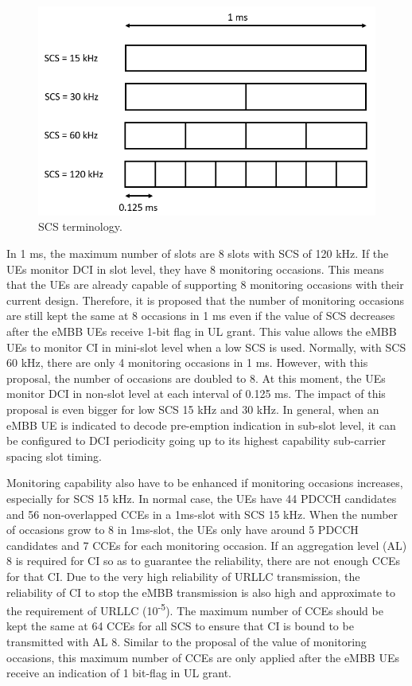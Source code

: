 \documentclass{ieeeaccess}
\begin{document}
\begin{figure}[htbp]
\centerline{\includegraphics[scale=0.3]{fig9.PNG}}
\caption{SCS terminology.}
\label{fig9}
\vspace{-2mm}
\end{figure}

In 1 ms, the maximum number of slots are 8 slots with SCS of 120 kHz. If the UEs monitor DCI in slot level, they have 8 monitoring occasions. This means that the UEs are already capable of supporting 8 monitoring occasions with their current design. Therefore, it is proposed that the number of monitoring occasions are still kept the same at 8 occasions in 1 ms even if the value of SCS decreases after the eMBB UEs receive 1-bit flag in UL grant. This value allows the eMBB UEs to monitor CI in mini-slot level when a low SCS is used. Normally, with SCS 60 kHz, there are only 4 monitoring occasions in 1 ms. However, with this proposal, the number of occasions are doubled to 8. At this moment, the UEs monitor DCI in non-slot level at each interval of 0.125 ms. The impact of this proposal is even bigger for low SCS 15 kHz and 30 kHz. In general, when an eMBB UE is indicated to decode pre-emption indication in sub-slot level, it can be configured to DCI periodicity going up to its highest capability sub-carrier spacing slot timing. 

Monitoring capability also have to be enhanced if monitoring occasions increases, especially for SCS 15 kHz. In normal case, the UEs have 44 PDCCH candidates and 56 non-overlapped CCEs in a 1ms-slot with SCS 15 kHz. When the number of occasions grow to 8 in 1ms-slot, the UEs only have around 5 PDCCH candidates and 7 CCEs for each monitoring occasion. If an aggregation level (AL) 8 is required for CI so as to guarantee the reliability, there are not enough CCEs for that CI. Due to the very high reliability of URLLC transmission, the reliability of CI to stop the eMBB transmission is also high and approximate to the requirement of URLLC (10\textsuperscript{-5}). The maximum number of CCEs should be kept the same at 64 CCEs for all SCS to ensure that CI is bound to be transmitted with AL 8. Similar to the proposal of the value of monitoring occasions, this maximum number of CCEs are only applied after the eMBB UEs receive an indication of 1 bit-flag in UL grant.
\end{document}
